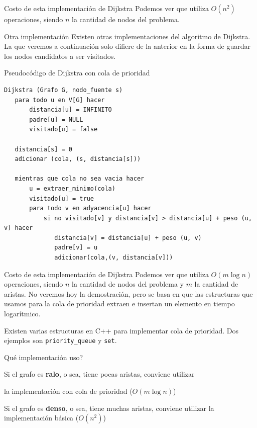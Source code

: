 \documentclass[compress]{beamer}
\begin{document}
\begin{frame}{Costo de esta implementación de Dijkstra}
Podemos ver que utiliza $O(n^2)$ operaciones, siendo $n$ la cantidad de
nodos del problema.
\end{frame}

\begin{frame}{Otra implementación}
Existen otras implementaciones del algoritmo de Dijkstra. La que veremos
a continuación solo difiere de la anterior en la forma de guardar los
nodos candidatos a ser visitados.
\end{frame}

\begin{frame}[fragile]{Pseudocódigo de Dijkstra con cola de prioridad}
\begin{lstlisting}
Dijkstra (Grafo G, nodo_fuente s)       
   para todo u en V[G] hacer
       distancia[u] = INFINITO
       padre[u] = NULL
       visitado[u] = false
       
   distancia[s] = 0
   adicionar (cola, (s, distancia[s]))
   
   mientras que cola no sea vacia hacer
       u = extraer_minimo(cola)
       visitado[u] = true
       para todo v en adyacencia[u] hacer
           si no visitado[v] y distancia[v] > distancia[u] + peso (u, v) hacer
              distancia[v] = distancia[u] + peso (u, v)
              padre[v] = u
              adicionar(cola,(v, distancia[v]))
\end{lstlisting}
\end{frame}

\begin{frame}{Costo de esta implementación de Dijkstra}
Podemos ver que utiliza $O(m \log n)$ operaciones, siendo $n$ la cantidad de
nodos del problema y $m$ la cantidad de aristas. No veremos hoy la demostración,
pero se basa en que las estructuras que usamos para la cola de prioridad
extraen e insertan un elemento en tiempo logarítmico.

\bigskip

Existen varias estructuras en C++ para implementar cola de prioridad. Dos
ejemplos son \texttt{priority\_queue} y \texttt{set}.

\end{frame}

\begin{frame}{\textquestiondown Qué implementación uso?}
\begin{itemize}
\item Si el grafo es \textbf{ralo}, o sea, tiene pocas aristas, conviene utilizar 
\\ \pause {} { la implementación con cola de prioridad ($O(m \log n)$) 
\pause {} { 
\item Si el grafo es \textbf{denso}, o sea, tiene muchas aristas, conviene 
utilizar \pause {} { la implementación básica ($O(n^2)$) } } } 
\end{itemize} 
\end{frame}
\end{document}
